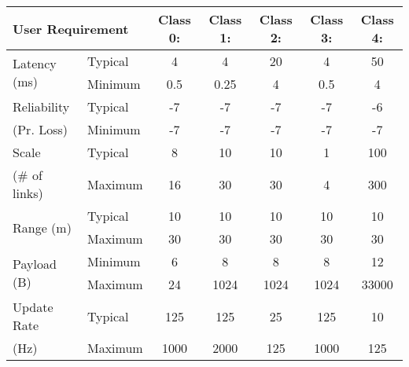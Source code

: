 \begin{tabular}{|p{5.715em}|p{4.855em}|c|c|c|c|c|}
	\toprule
	\multicolumn{2}{|p{10.57em}|}{\textbf{User Requirement}\tnote{1,2}} & \multicolumn{1}{p{4.355em}|}{\textbf{Class 0:}} & \multicolumn{1}{p{4.355em}|}{\textbf{Class 1:}} & \multicolumn{1}{p{4.355em}|}{\textbf{Class 2:}} & \multicolumn{1}{p{4.355em}|}{\textbf{Class 3:}} & \multicolumn{1}{p{4.355em}|}{\textbf{Class 4:}} \\
	\midrule
	\multirow{2}[4]{*}{Latency (ms)} & Typical & 4     & 4     & 20    & 4     & 50 \\
	\cmidrule{2-7}\multicolumn{1}{|r|}{} & Minimum & 0.5   & 0.25  & 4     & 0.5   & 4 \\
	\midrule
	Reliability\tnote{3} & Typical & -7    & -7    & -7    & -7    & -6 \\
	\cmidrule{2-7}(Pr. Loss) & Minimum & -7    & -7    & -7    & -7    & -7 \\
	\midrule
	Scale & Typical & 8     & 10    & 10    & 1     & 100 \\
	\cmidrule{2-7}(\# of links) & Maximum & 16    & 30    & 30    & 4     & 300 \\
	\midrule
	\multirow{2}[4]{*}{Range (m)} & Typical & 10    & 10    & 10    & 10    & 10 \\
	\cmidrule{2-7}\multicolumn{1}{|r|}{} & Maximum & 30    & 30    & 30    & 30    & 30 \\
	\midrule
	\multirow{2}[4]{*}{Payload (B)} & Minimum & 6     & 8     & 8     & 8     & 12 \\
	\cmidrule{2-7}\multicolumn{1}{|r|}{} & Maximum  & 24    & 1024  & 1024  & 1024  & 33000 \\
	\midrule
	Update Rate & Typical & 125   & 125   & 25    & 125   & 10 \\
	\cmidrule{2-7}(Hz)  & Maximum & 1000  & 2000  & 125   & 1000  & 125 \\
	\bottomrule
\end{tabular}%
